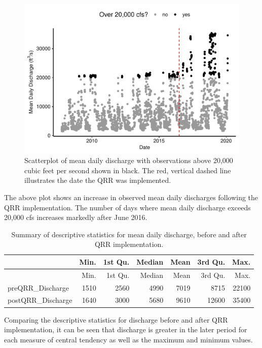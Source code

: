 \documentclass[12pt,]{article}
\begin{document}
\begin{figure}
\centering
\includegraphics{Project_Template_files/figure-latex/unnamed-chunk-2-1.pdf}
\caption{Scatterplot of mean daily discharge with observations above
20,000 cubic feet per second shown in black. The red, vertical dashed
line illustrates the date the QRR was implemented.}
\end{figure}

The above plot shows an increase in observed mean daily discharges
following the QRR implementation. The number of days where mean daily
discharge exceeds 20,000 cfs increases markedly after June 2016.

\begin{longtable}[]{@{}lrrrrrr@{}}
\caption{Summary of descriptive statistics for mean daily discharge,
before and after QRR implementation.}\tabularnewline
\toprule
& Min. & 1st Qu. & Median & Mean & 3rd Qu. & Max.\tabularnewline
\midrule
\endfirsthead
\toprule
& Min. & 1st Qu. & Median & Mean & 3rd Qu. & Max.\tabularnewline
\midrule
\endhead
preQRR\_Discharge & 1510 & 2560 & 4990 & 7019 & 8715 &
22100\tabularnewline
postQRR\_Discharge & 1640 & 3000 & 5680 & 9610 & 12600 &
35400\tabularnewline
\bottomrule
\end{longtable}

Comparing the descriptive statistics for discharge before and after QRR
implementation, it can be seen that discharge is greater in the later
period for each measure of central tendency as well as the maximum and
minimum values.
\end{document}
